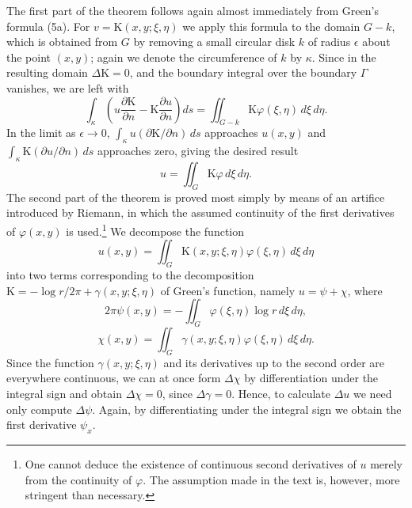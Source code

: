 The first part of the theorem follows again almost immediately from Green's formula (5a). For $v=\mathrm K(x,y;\xi,\eta)$ we apply this formula to the domain $G-k$, which is obtained from $G$ by removing a small circular disk $k$ of radius $\epsilon$ about the point $(x,y)$; again we denote the circumference of $k$ by $\kappa$. Since in the resulting domain $\Delta\mathrm K=0$, and the boundary integral over the boundary $\Gamma$ vanishes, we are left with
\[
\int_\kappa\left(u\frac{\partial\mathrm K}{\partial n}-\mathrm K\frac{\partial u}{\partial n}\right)ds
=\iint_{G-k}\mathrm K\varphi(\xi,\eta)\,d\xi\,d\eta.
\]
In the limit as $\epsilon\to0$, $\int_\kappa u(\partial\mathrm K/\partial n)\,ds$ approaches $u(x,y)$ and $\int_\kappa \mathrm K(\partial u/\partial n)\,ds$ approaches zero, giving the desired result
\[
u=\iint_G\mathrm K\varphi\,d\xi\,d\eta.
\]
The second part of the theorem is proved most simply by means of an artifice introduced by Riemann, in which the assumed continuity of the first derivatives of $\varphi(x,y)$ is used.\footnote{One cannot deduce the existence of continuous second derivatives of $u$ merely from the continuity of $\varphi$. The assumption made in the text is, however, more stringent than necessary.} We decompose the function
\[
u(x,y)=\iint_G\mathrm K(x,y;\xi,\eta)\varphi(\xi,\eta)\,d\xi\,d\eta
\]
into two terms corresponding to the decomposition $\mathrm K=-\log r/2\pi+\gamma(x,y;\xi,\eta)$ of Green's function, namely $u=\psi+\chi$, where
\[
2\pi\psi(x,y)=-\iint_G\varphi(\xi,\eta)\log r\,d\xi\,d\eta,
\]
\[
\chi(x,y)=\iint_G\gamma(x,y;\xi,\eta)\varphi(\xi,\eta)\,d\xi\,d\eta.
\]
Since the function $\gamma(x,y;\xi,\eta)$ and its derivatives up to the second order are everywhere continuous, we can at once form $\Delta\chi$ by differentiation under the integral sign and obtain $\Delta\chi=0$, since $\Delta\gamma=0$. Hence, to calculate $\Delta u$ we need only compute $\Delta\psi$. Again, by differentiating under the integral sign we obtain the first derivative $\psi_x$.

